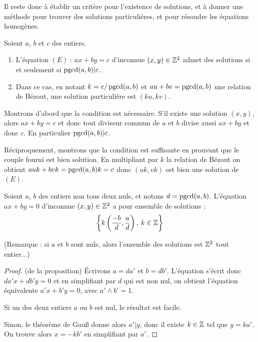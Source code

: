 Il reste donc à établir un critère pour l'existence de solutions, et à donner une méthode pour trouver des solutions particulières, et pour résoudre les équations homogènes.

\begin{proposition}
Soient $a$, $b$ et $c$ des entiers.
\begin{enumerate}
\item L'équation $(E)\: : \: ax+by=c$ d'inconnue $(x,y)\in \mathbb{Z}^2$ admet des solutions si et seulement si $\operatorname{pgcd}(a,b)|c$.
\item Dans ce cas, en notant $k=c/\operatorname{pgcd}(a,b)$ et $au+bv=\operatorname{pgcd}(a,b)$ une relation de Bézout, une solution particulière est $(ku,kv)$.
\end{enumerate}
\end{proposition}
\begin{preuve}
Montrons d'abord que la condition est nécessaire. S'il existe une solution $(x,y)$, alors $ax+by=c$ et donc tout diviseur commun de $a$ et $b$ divise aussi $ax+by$ et donc $c$. En  particulier $\operatorname{pgcd}(a,b) | c$.

Réciproquement, montrons que la condition est suffisante en prouvant que le couple fourni est bien solution. En multipliant par $k$ la relation de Bézout on obtient $auk+bvk=\operatorname{pgcd}(a,b) k=c$ donc $(uk,vk)$ est bien une solution de $(E)$.
\end{preuve}


\begin{proposition}
Soient $a$, $b$ des entiers non tous deux  nuls, et notons $d = \operatorname{pgcd}(a,b)$. L'équation $ax+by=0$ d'inconnue $(x,y)\in \mathbb{Z}^2$ a pour ensemble de solutions :
\[
\left\{k\left(\frac{-b}{d} , \frac{a}{d}\right),\: k\in \mathbb{Z}\right\}
\]
\end{proposition}

(Remarque : si $a$ et $b$ sont nuls, alors l'ensemble des solutions est $\mathbb{Z}^2$ tout entier...)

\begin{proof}(de la proposition)
\'Ecrivons $a=da'$ et $b=db'$. L'équation s'écrit donc $da'x+db'y=0$ et en simplifiant par $d$ qui est non nul, on obtient l'équation équivalente $a'x+b'y=0$, avec $a'\wedge b'=1$.

Si un des deux entiers $a$ ou $b$ est nul, le résultat est facile.

Sinon, le théorème de Gau{\ss} donne alors $a'|y$, donc il existe $k\in \mathbb{Z}$ tel que $y = ka'$.  On trouve alors $x=-kb'$ en simplifiant par $a'$.
\end{proof}

